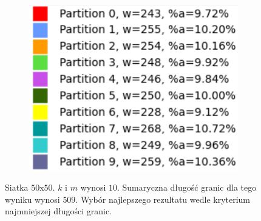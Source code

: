 \begin{figure}[h]
\begin{subfigure}{.33\textwidth}
    \centering
    \includegraphics[width=0.9\linewidth]{images/results/m/3/results}
    \caption[short]{}
\end{subfigure}
\caption{Siatka $50$x$50$. $k$ i $m$ wynosi $10$.
Sumaryczna długość granic dla tego wyniku wynosi $509$.
Wybór najlepszego rezultatu wedle kryterium najmniejszej długości granic.}
\label{result:m:3}
\end{figure}
